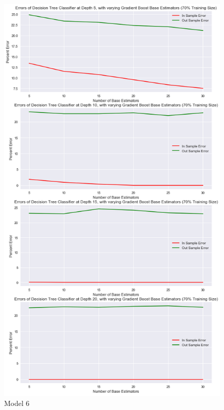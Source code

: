 \documentclass[10pt,twocolumn]{article}
\begin{document}
\begin{figure}[!t]
  \begin{center}
    \includegraphics[width=\textwidth,height=\textheight,keepaspectratio]{gradient_boost.png}
  \end{center}

  \caption{\small Model 6}
  \label{fig-1}
\end{figure}
\end{document}
